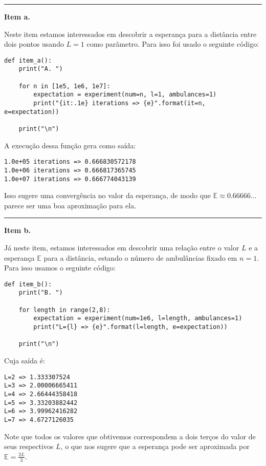 \documentclass[9.5pt,reqno,a4paper]{amsart}
\begin{document}
\newpage
\noindent\rule{\textwidth}{0.4pt}
\textbf{Item a.}

Neste item estamos interessados em descobrir a esperança para a distância entre dois pontos usando $L=1$ como parâmetro. Para isso foi usado o seguinte código:

\begin{verbatim}
def item_a():
    print("A. ")

    for n in [1e5, 1e6, 1e7]:
        expectation = experiment(num=n, l=1, ambulances=1)
        print("{it:.1e} iterations => {e}".format(it=n, e=expectation))

    print("\n")
\end{verbatim}

A execução dessa função gera como saída:

\begin{verbatim}
1.0e+05 iterations => 0.666830572178
1.0e+06 iterations => 0.666817365745
1.0e+07 iterations => 0.666774043139
\end{verbatim}

Isso sugere uma convergência no valor da esperança, de modo que $\mathbb{E} \approx 0.66666...$ parece ser uma boa aproximação para ela.

\bigskip
\noindent\rule{\textwidth}{0.4pt}
\textbf{Item b.}

Já neste item, estamos interessados em descobrir uma relação entre o valor $L$ e a esperança $\mathbb{E}$ para a distância, estando o número de ambulâncias fixado em $n=1$. Para isso usamos o seguinte código:

\begin{verbatim}
def item_b():
    print("B. ")

    for length in range(2,8):
        expectation = experiment(num=1e6, l=length, ambulances=1)
        print("L={l} => {e}".format(l=length, e=expectation))

    print("\n")
\end{verbatim}

Cuja saída é:

\begin{verbatim}
L=2 => 1.333307524
L=3 => 2.00006665411
L=4 => 2.66444358418
L=5 => 3.33203882442
L=6 => 3.99962416282
L=7 => 4.6727126035
\end{verbatim}

Note que todos os valores que obtivemos correspondem a dois terços do valor de seus respectivos $L$, o que nos sugere que a esperança pode ser aproximada por $\mathbb{E} = \frac{2L}{3}$.
\end{document}
